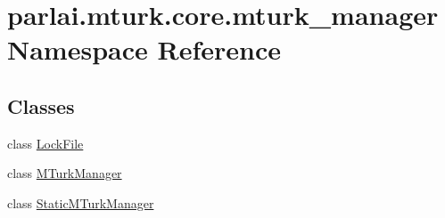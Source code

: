 \hypertarget{namespaceparlai_1_1mturk_1_1core_1_1mturk__manager}{}\section{parlai.\+mturk.\+core.\+mturk\+\_\+manager Namespace Reference}
\label{namespaceparlai_1_1mturk_1_1core_1_1mturk__manager}
\subsection*{Classes}
\begin{DoxyCompactItemize}
\item 
class \hyperlink{classparlai_1_1mturk_1_1core_1_1mturk__manager_1_1LockFile}{Lock\+File}
\item 
class \hyperlink{classparlai_1_1mturk_1_1core_1_1mturk__manager_1_1MTurkManager}{M\+Turk\+Manager}
\item 
class \hyperlink{classparlai_1_1mturk_1_1core_1_1mturk__manager_1_1StaticMTurkManager}{Static\+M\+Turk\+Manager}
\end{DoxyCompactItemize}

